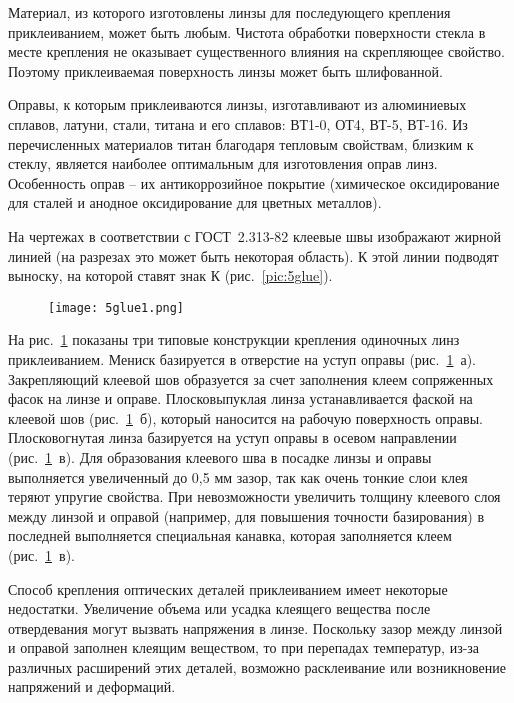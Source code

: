 Материал, из которого изготовлены линзы для последующего крепления приклеиванием, может быть любым. Чистота обработки поверхности стекла в месте крепления не оказывает существенного влияния на скрепляющее свойство. Поэтому приклеиваемая поверхность линзы может быть шлифованной.

Оправы, к которым приклеиваются линзы, изготавливают из алюминиевых сплавов, латуни, стали, титана и его сплавов: ВТ1-0, ОТ4, ВТ-5, ВТ-16. Из перечисленных материалов титан благодаря тепловым свойствам, близким к стеклу, является наиболее оптимальным для изготовления оправ линз. Особенность оправ -- их антикоррозийное покрытие (химическое оксидирование для сталей и анодное оксидирование для цветных металлов).

На чертежах в соответствии с ГОСТ~2.313-82 клеевые швы изображают жирной линией (на разрезах это может быть некоторая область). К этой линии подводят выноску, на которой ставят знак К (рис.~\ref{pic:5glue}).

\begin{figure}[h!]
	\texttt{[image: 5glue1.png]}
	\label{pic:5glue1}
\end{figure}

На рис.~\ref{pic:5glue1} показаны три типовые конструкции крепления одиночных линз приклеиванием. Мениск базируется в отверстие на уступ оправы (рис.~\ref{pic:5glue1}~а). Закрепляющий клеевой шов образуется за счет заполнения клеем сопряженных фасок на линзе и оправе. Плосковыпуклая линза устанавливается фаской на клеевой шов (рис.~\ref{pic:5glue1}~б), который наносится на рабочую поверхность оправы. Плосковогнутая линза базируется на уступ оправы в осевом направлении (рис.~\ref{pic:5glue1}~в). Для образования клеевого шва в посадке линзы и оправы выполняется увеличенный до 0,5 мм зазор, так как очень тонкие слои клея теряют упругие свойства. При невозможности увеличить толщину клеевого слоя между линзой и оправой (например, для повышения точности базирования) в последней выполняется специальная канавка, которая заполняется клеем (рис.~\ref{pic:5glue1}~в).

Способ крепления оптических деталей приклеиванием имеет некоторые недостатки. Увеличение объема или усадка клеящего вещества после отвердевания могут вызвать напряжения в линзе. Поскольку зазор между линзой и оправой заполнен клеящим веществом, то при перепадах температур, из-за различных расширений этих деталей, возможно расклеивание или возникновение напряжений и деформаций. 

